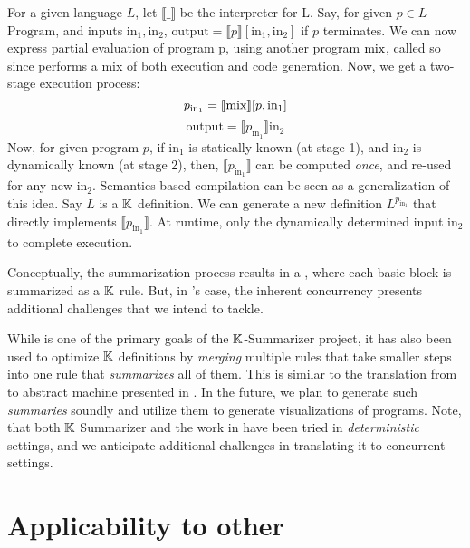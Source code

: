 For a given language $L$, let $\llbracket\_\rrbracket$ be the
interpreter for L. Say, for given $p \in L$--$\text{Program}$, and inputs
$\text{in}_1, \text{in}_2$,
$\text{output} = \llbracket p \rrbracket\left[\text{in}_1,\text{in}_2\right]$
if $p$ terminates.
We can now express partial evaluation of program p, using another
program $\text{mix}$, called so since performs a mix of both execution and code
generation. Now, we get a two-stage execution process:
$$ p_{\text{in}_1} = \llbracket \text{mix} \rrbracket [p, \text{in}_1]$$
$$ \text{output} = \llbracket p_{\text{in}_1} \rrbracket \text{in}_2$$
Now, for given program $p$, if $\text{in}_1$ is statically known (at stage 1),
and $\text{in}_2$ is dynamically known (at stage 2), then,
$\llbracket p_{\text{in}_1} \rrbracket$ can be computed \emph{once}, and
re-used for any new $\text{in}_2$.
Semantics-based compilation can be seen as a generalization of this idea.
Say $L$ is a $\mathbb{K}$ definition. We can generate a new definition
$L^{p_{\text{in}_1}}$ that directly implements $\llbracket p_{\text{in}_1}
\rrbracket$. At runtime, only the dynamically determined input $\text{in}_2$
to complete execution.

Conceptually, the summarization process results in a \CFG{}, where
each basic block is summarized as a $\mathbb{K}$ rule. But, in \MediK{}'s
case, the inherent concurrency presents additional challenges
that we intend to tackle.

While \SBC{} is one of the primary goals of the $\mathbb{K}{}$-Summarizer
project, it has also been used to optimize $\mathbb{K}$ definitions
by \emph{merging} multiple rules that take smaller steps into
one rule that \emph{summarizes} all of them. This is similar
to the translation from \SOS{} to abstract machine presented in
\cite{KoppelICFP22}. In the future, we plan to generate such
\emph{summaries} soundly and utilize them to generate visualizations
of \MediK{} programs. Note, that both $\mathbb{K}$ Summarizer and the work
in \cite{KoppelICFP22} have been tried in \emph{deterministic} settings,
and we anticipate additional challenges in translating it to concurrent
settings.

\section{Applicability to other \CDSSs{}}\label{subsec:applicability}


